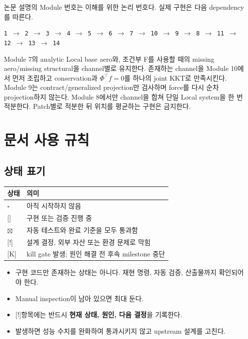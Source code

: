 \documentclass[10pt,a4paper]{article}
\newcommand{\todo}{\textcolor{TodoGray}{\(\square\)}}
\newcommand{\progress}{\textcolor{ProgressBlue}{[{\raisebox{0.1ex}{\(\sim\)}}]}}
\newcommand{\done}{\textcolor{DoneGreen}{\(\boxtimes\)}}
\newcommand{\blocked}{\textcolor{BlockRed}{[!]}}
\newcommand{\killmark}{\textcolor{KillRed}{[K]}}
\newcommand{\code}[1]{\texttt{#1}}
\begin{document}
\begin{tcolorbox}[colback=LightRed,colframe=KillRed,title=가장 중요한 실행 순서 계약,fonttitle=\bfseries]
논문 설명의 Module 번호는 이해를 위한 논리 번호다. 실제 구현은 다음 dependency를 따른다.
\begin{center}
\code{1 $\rightarrow$ 2 $\rightarrow$ 3 $\rightarrow$ 4 $\rightarrow$ 5 $\rightarrow$ 6 $\rightarrow$ 7
$\rightarrow$ 10 $\rightarrow$ 9 $\rightarrow$ 8 $\rightarrow$ 11 $\rightarrow$ 12 $\rightarrow$ 13 $\rightarrow$ 14}
\end{center}
Module 7의 analytic Local base aero와, 조건부 F를 사용할 때의 missing aero/missing structural을 channel별로 유지한다.
존재하는 channel을 Module 10에서 먼저 조립하고 conservation과
\(\Phi^\top f=0\)를 하나의 joint KKT로 만족시킨다.
Module 9는 contract/generalized projection만 검사하며 force를 다시 순차 projection하지 않는다.
Module 8에서만 channel을 합쳐 단일 Local system을 한 번 적분한다.
Patch별로 적분한 뒤 위치를 평균하는 구현은 금지한다.
\end{tcolorbox}

\tableofcontents
\newpage

\section{문서 사용 규칙}

\subsection{상태 표기}

\begin{center}
\begin{tabular}{@{}ll@{}}
\toprule
상태 & 의미 \\
\midrule
\todo & 아직 시작하지 않음 \\
\progress & 구현 또는 검증 진행 중 \\
\done & 자동 테스트와 완료 기준을 모두 통과함 \\
\blocked & 설계 결정, 외부 자산 또는 환경 문제로 막힘 \\
\killmark & kill gate 발생; 원인 해결 전 후속 milestone 중단 \\
\bottomrule
\end{tabular}
\end{center}

\begin{itemize}
  \item 구현 코드만 존재하는 상태는  아니다. 재현 명령, 자동 검증, 산출물까지 확인되어야 한다.
  \item Manual inspection이 남아 있으면 최대  둔다.
  \item \blocked 항목에는 반드시 \textbf{현재 상태, 원인, 다음 결정}을 기록한다.
  \item {} 발생하면 성능 수치를 완화하여 통과시키지 않고 upstream 설계를 고친다.
\end{itemize}
\end{document}
